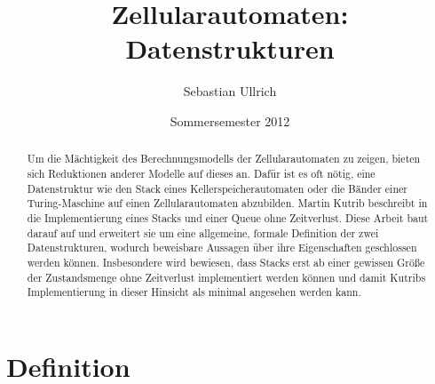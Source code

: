 \documentclass{article}
\title{Zellularautomaten: Datenstrukturen}
\author{Sebastian Ullrich}
\date{Sommersemester 2012}
\begin{document}
\newcommand{\ca}{\ensuremath\mathcal{A}}
\newcommand{\abs}[1]{\lvert#1\rvert}
\newcommand{\ceil}[1]{\lceil#1\rceil}
\newcommand{\zrange}[1]{\mathbb{G}_{#1}}
\newcommand{\bild}[1]{\text{Bild}(#1)}
\newcommand{\N}{\mathbb{N}}
\newcommand{\ve}[3]{\begin{pmatrix}#1\\#2\\#3\end{pmatrix}}

\newcommand{\pop}{\ensuremath\mathit{pop}}
\newcommand{\popZiel}{\ensuremath\mathit{popZiel}}
\newcommand{\popQuelle}{\ensuremath\mathit{popQuelle}}
\newcommand{\nop}{\ensuremath\mathit{nop}}
\newcommand{\push}{\ensuremath\mathit{push}}
\newcommand{\pushZiel}{\ensuremath\mathit{pushZiel}}
\newcommand{\pushQuelle}{\ensuremath\mathit{pushQuelle}}

\maketitle
\newpage

\begin{abstract}
    Um die Mächtigkeit des Berechnungsmodells der Zellularautomaten zu zeigen, bieten sich Reduktionen anderer Modelle auf dieses an. Dafür ist es oft nötig, eine Datenstruktur wie den Stack eines Kellerspeicherautomaten oder die Bänder einer Turing-Maschine auf einen Zellularautomaten abzubilden. Martin Kutrib beschreibt in \cite{kutrib08} die Implementierung eines Stacks und einer Queue ohne Zeitverlust. Diese Arbeit baut darauf auf und erweitert sie um eine allgemeine, formale Definition der zwei Datenstrukturen, wodurch beweisbare Aussagen über ihre Eigenschaften geschlossen werden können. Insbesondere wird bewiesen, dass Stacks erst ab einer gewissen Größe der Zustandsmenge ohne Zeitverlust implementiert werden können und damit Kutribs Implementierung in dieser Hinsicht als minimal angesehen werden kann.
\end{abstract}

\section{Definition}
\end{document}
